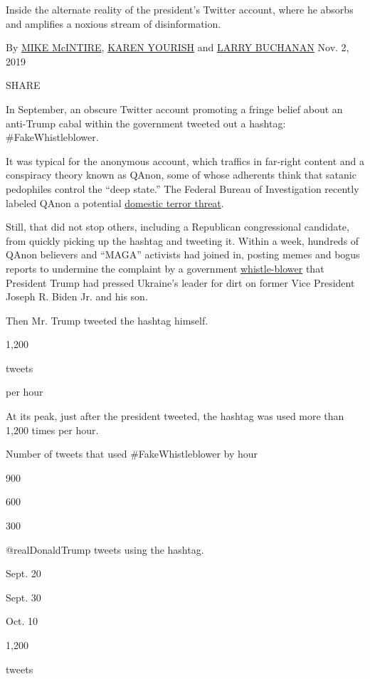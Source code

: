 Inside the alternate reality of the president's Twitter account, where
he absorbs and amplifies a noxious stream of disinformation.

By \href{https://www.nytimes.com/by/mike-mcintire}{MIKE McINTIRE},
\href{https://www.nytimes.com/by/karen-yourish}{KAREN YOURISH} and
\href{https://www.nytimes.com/by/larry-buchanan}{LARRY BUCHANAN} Nov. 2,
2019

SHARE

In September, an obscure Twitter account promoting a fringe belief about
an anti-Trump cabal within the government tweeted out a hashtag:
\#FakeWhistleblower.

It was typical for the anonymous account, which traffics in far-right
content and a conspiracy theory known as QAnon, some of whose adherents
think that satanic pedophiles control the ``deep state.'' The Federal
Bureau of Investigation recently labeled QAnon a potential
\href{https://news.yahoo.com/fbi-documents-conspiracy-theories-terrorism-160000507.html}{domestic
terror threat}.

Still, that did not stop others, including a Republican congressional
candidate, from quickly picking up the hashtag and tweeting it. Within a
week, hundreds of QAnon believers and ``MAGA'' activists had joined in,
posting memes and bogus reports to undermine the complaint by a
government
\href{https://www.nytimes.com/2019/09/27/podcasts/the-daily/whistleblower-complaint-trump-maguire.html?searchResultPosition=34}{whistle-blower}
that President Trump had pressed Ukraine's leader for dirt on former
Vice President Joseph R. Biden Jr. and his son.

Then Mr. Trump tweeted the hashtag himself.

1,200

tweets

per hour

At its peak, just after the president tweeted, the hashtag was used more
than 1,200 times per hour.

Number of tweets that used \#FakeWhistleblower by hour

900

600

300

@realDonaldTrump tweets using the hashtag.

Sept. 20

Sept. 30

Oct. 10

1,200

tweets

